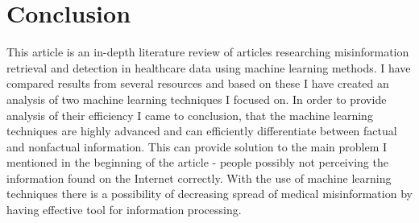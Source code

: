 \documentclass[11pt ,english,a4paper]{article}
\begin{document}
\section{Conclusion}\label{conclusion}

This article is an in-depth literature review of articles researching misinformation retrieval and detection in healthcare data using machine learning methods. I have compared results from several resources and based on these I have created an analysis of two machine learning techniques I focused on. In order to provide analysis of their efficiency I came to conclusion, that the machine learning techniques are highly advanced and can efficiently differentiate between factual and nonfactual information. This can provide solution to the main problem I mentioned in the beginning of the article - people possibly not perceiving the information found on the Internet correctly. With the use of machine learning techniques there is a possibility of decreasing spread of medical misinformation by having effective tool for information processing.

\newpage


\end{document}
